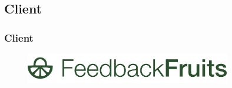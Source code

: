 \subsection{Client}

\begin{frame}\frametitle{Client}
    \begin{figure}[ht!]
        \centering
        \includegraphics[width=0.8\textwidth]{./media/feedbackfruits-logo}
        \label{fig:goal-design}
    \end{figure}
\end{frame}


